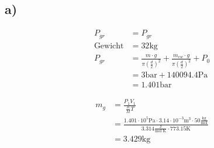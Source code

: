 

\subsection*{a)}
\begin{align*}
P_{gr} &= P_{gr} \\
\text{Gewicht} &= 32 \text{kg} \\
P_{gr} &= \frac{m \cdot g}{\pi \left(\frac{d}{2}\right)^2} + \frac{m_{ew} \cdot g}{\pi \left(\frac{d}{2}\right)^2} + P_0 \\
&= 3 \text{bar} + 140094.4 \text{Pa} \\
&= 1.401 \text{bar}
\end{align*}

\begin{align*}
m_g &= \frac{P_1 V_1}{\frac{R}{M} T} \\
&= \frac{1.401 \cdot 10^5 \text{Pa} \cdot 3.14 \cdot 10^{-3} \text{m}^3 \cdot 50 \frac{\text{kg}}{\text{mol}}}{3.314 \frac{\text{J}}{\text{mol K}} \cdot 773.15 \text{K}} \\
&= 3.429 \text{kg}
\end{align*}